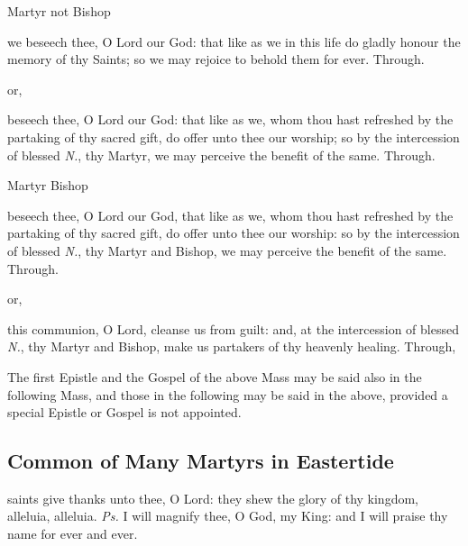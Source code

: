 
\postcommunion
\begin{inhead}
	Martyr not Bishop
\end{inhead}
 we beseech thee, O Lord our God: that like as we in this life do gladly honour the memory of thy Saints; so we may rejoice to behold them for ever. Through.
\begin{inhead}
	or,
\end{inhead}
 beseech thee, O Lord our God: that like as we, whom thou hast refreshed by the partaking of thy sacred gift, do offer unto thee our worship; so by the intercession of blessed \textit{N.}, thy Martyr, we may perceive the benefit of the same. Through.

\clearpage
\begin{inhead}
	Martyr Bishop
\end{inhead}
 beseech thee, O Lord our God, that like as we, whom thou hast refreshed by the partaking of thy sacred gift, do offer unto thee our worship: so by the intercession of blessed \textit{N.}, thy Martyr and Bishop, we may perceive the benefit of the same. Through.
\begin{inhead}
	or,
\end{inhead}
 this communion, O Lord, cleanse us from guilt: and, at the intercession of blessed \textit{N.}, thy Martyr and Bishop, make us partakers of thy heavenly healing. Through,

\begin{rubric}
	The first Epistle and the Gospel of the above Mass may be said also in the following Mass, and those in the following may be said in the above, provided a special Epistle or Gospel is not appointed.
\end{rubric}


\subsection{Common of Many Martyrs in Eastertide}\label{CommonMartyrsEaster}

\introit
{} saints give thanks unto thee, O Lord: they shew the glory of thy kingdom, alleluia, alleluia. \textit{Ps.} I will magnify thee, O God, my King: and I will praise thy name for ever and ever.

